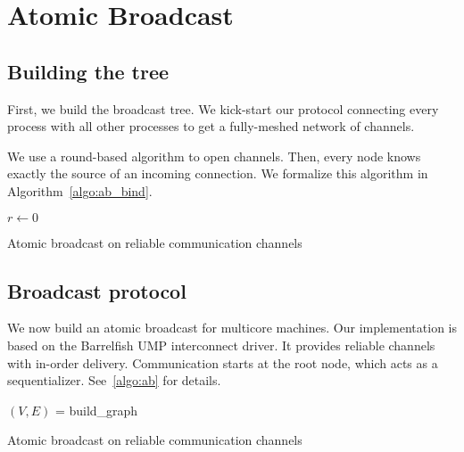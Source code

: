 \documentclass{article}
\begin{document}
\section{Atomic Broadcast}

\subsection{Building the tree}

First, we build the broadcast tree. We kick-start our protocol
connecting every process with all other processes to get a
fully-meshed network of channels.

We use a round-based algorithm to open channels. Then, every node
knows exactly the source of an incoming connection. We formalize this
algorithm in Algorithm~\ref{algo:ab_bind}.

\begin{algorithm}[H]
  \BlankLine
  \BlankLine
  $r \leftarrow 0$\;
  \caption{Atomic broadcast on reliable communication channels}
  \label{algo:ab}
\end{algorithm}


\subsection{Broadcast protocol}

We now build an atomic broadcast for multicore machines. Our
implementation is based on the Barrelfish UMP interconnect driver. It
provides reliable channels with in-order delivery. Communication
starts at the root node, which acts as a
sequentializer. See~\ref{algo:ab} for details.

\begin{algorithm}[H]
  \SetAlgoLined
  $(V, E)$ = build\_graph\;
  \caption{Atomic broadcast on reliable communication channels}
  \label{algo:ab}
\end{algorithm}
\end{document}
